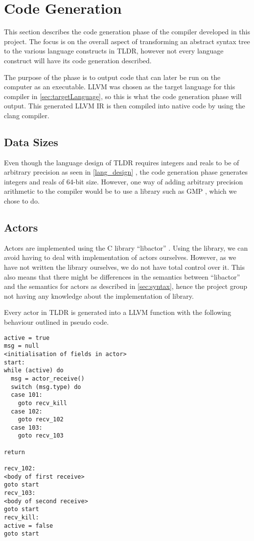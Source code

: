 \section{Code Generation}

This section describes the code generation phase of the compiler developed in this project. The focus is on the overall aspect of transforming an abstract syntax tree to the various language constructs in TLDR, however not every language construct will have its code generation described. 

The purpose of the phase is to output code that can later be run on the computer as an executable. LLVM was chosen as the target language for this compiler in \cref{sec:targetLanguage}, so this is what the code generation phase will output. This generated LLVM IR is then compiled into native code by using the clang compiler.

\subsection{Data Sizes}

Even though the language design of TLDR requires integers and reals to be of arbitrary precision as seen in \cref{lang_design} , the code generation phase generates integers and reals of 64-bit size. However, one way of adding arbitrary precision arithmetic to the compiler would be to use a library such as GMP \cite{gmp}, which we chose to do.

\subsection{Actors}

Actors are implemented using the C library \enquote{libactor} \cite{libactor}. Using the library, we can avoid having to deal with implementation of actors ourselves. However, as we have not written the library ourselves, we do not have total control over it. This also means that there might be differences in the semantics between \enquote{libactor} and the semantics for actors as described in \cref{sec:syntax}, hence the project group not having any knowledge about the implementation of library.

Every actor in TLDR is generated into a LLVM function with the following behaviour outlined in pseudo code.

\begin{lstlisting}[breaklines]
active = true
msg = null
<initialisation of fields in actor>
start:
while (active) do
  msg = actor_receive()
  switch (msg.type) do
  case 101:
    goto recv_kill
  case 102:
    goto recv_102
  case 103:
    goto recv_103

return

recv_102:
<body of first receive>
goto start 
recv_103:
<body of second receive>
goto start 
recv_kill:
active = false
goto start
\end{lstlisting}

